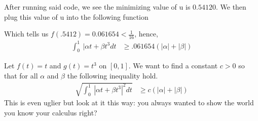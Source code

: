 \documentclass[11pt]{SelfArxOneColBMN}
\begin{document}
\begin{solution}
\begin{enumerate}
   \singlespacing
   
   \onehalfspacing

   After running said code, we see the minimizing value of u is $0.54120$. We then plug this value of u into the following function  
   \singlespacing
    
    \onehalfspacing

   Which tells us $f(.5412) = 0.061654 < \frac{1}{16}$, hence,
    \begin{eqnarray*}
      \int_0^1 \: | \alpha t + \beta t^3 dt &\geq .061654( |\alpha| + |\beta|)
    \end{eqnarray*}
  \end{enumerate}
\end{solution}

	
\begin{exercise}
Let $f(t) = t$ and $g(t) = t^3$ on $[0,1]$.
We want to find a constant $c>0$ so that for all $\alpha$ and
$\beta$ the following inequality hold.
\begin{eqnarray*}
\sqrt{\int_0^1 \: | \alpha t + \beta t^3|^2 dt} &\geq c( |\alpha| + |\beta|)
\end{eqnarray*}
\noindent
This is even uglier but look at it this way: you always wanted to
show the world you know your calculus right?
\end{exercise}
\end{document}
